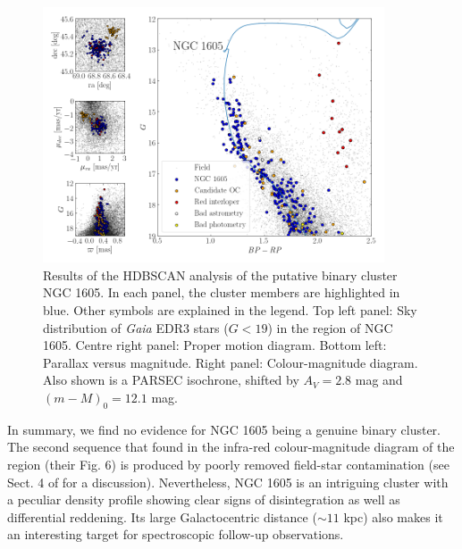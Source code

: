 \documentclass[RNAAS]{aastex631}
\begin{document}
\begin{figure}
\begin{center}
\includegraphics[width=0.9\textwidth,angle=0]{im/ngc1605_hdbscan_analysis.png}
\caption{Results of the HDBSCAN analysis of the putative binary cluster NGC 1605. In each panel, the cluster members are highlighted in blue. Other symbols are explained in the legend. Top left panel: Sky distribution of {\it Gaia} EDR3 stars ($G<19$) in the region of NGC 1605. Centre right panel: Proper motion diagram. Bottom left: Parallax versus magnitude. Right panel: Colour-magnitude diagram. Also shown is a PARSEC isochrone, shifted by $A_V=2.8$ mag and $(m-M)_0=12.1$ mag. \label{fig:1}}
\end{center}
\end{figure}

In summary, we find no evidence for NGC 1605 being a genuine binary cluster. The second sequence that \citet{Camargo2021} found in the infra-red colour-magnitude diagram of the region (their Fig. 6) is produced by poorly removed field-star contamination (see Sect. 4 of \citealt{CantatAnders2020} for a discussion).
Nevertheless, NGC 1605 is an intriguing cluster with a peculiar density profile showing clear signs of disintegration as well as differential reddening. Its large Galactocentric distance ($\sim 11$ kpc) also makes it an interesting target for spectroscopic follow-up observations. 
\end{document}
